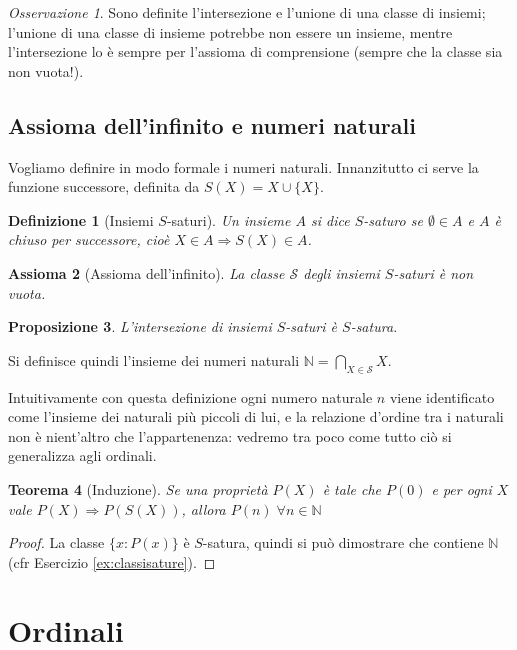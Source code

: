 \documentclass[a4paper,10pt,oneside]{article}
\theoremstyle{plain}
\newtheorem{mytheorem}{Teorema}[section]
\newtheorem{mydef}[mytheorem]{Definizione}
\newtheorem{myprop}[mytheorem]{Proposizione}
\newtheorem{myax}[mytheorem]{Assioma}
\theoremstyle{definition}
\theoremstyle{remark}
\newtheorem*{myobs}{Osservazione}
\begin{document}
\begin{myobs}
 Sono definite l'intersezione e l'unione di una classe di insiemi; l'unione di una classe di insieme potrebbe non essere un insieme, mentre l'intersezione lo è sempre per l'assioma di comprensione (sempre che la classe sia non vuota!).
\end{myobs}


\subsection{Assioma dell'infinito e numeri naturali}

Vogliamo definire in modo formale i numeri naturali. Innanzitutto ci serve la funzione successore, definita da $S(X)=X\cup\{X\}$. 
\begin{mydef}[Insiemi $S$-saturi]
Un insieme $A$ si dice $S$-saturo se $\emptyset \in A$ e $A$ è chiuso per successore, cioè $X\in A \Rightarrow S(X)\in A$.
\end{mydef}
\begin{myax}[Assioma dell'infinito]
 La classe $\mathcal S$ degli insiemi $S$-saturi è non vuota.
\end{myax}

\begin{myprop}
 L'intersezione di insiemi $S$-saturi è $S$-satura.
\end{myprop}

Si definisce quindi l'insieme dei numeri naturali $\mathbb N = \bigcap_{X\in \mathcal S} X$. 

Intuitivamente con questa definizione ogni numero naturale $n$ viene identificato come l'insieme dei naturali più piccoli di lui, e la relazione d'ordine tra i naturali non è nient'altro che l'appartenenza: vedremo tra poco come tutto ciò si generalizza agli ordinali.

\begin{mytheorem}[Induzione]
 Se una proprietà $P(X)$ è tale che $P(0)$ e per ogni $X$ vale $P(X)\Rightarrow P(S(X))$, allora $P(n)\;\forall n\in \mathbb N$
\end{mytheorem}
\begin{proof}
 La classe $\{x: P(x)\}$ è $S$-satura, quindi si può dimostrare che contiene $\mathbb N$ (cfr Esercizio \ref{ex:classisature}).
\end{proof}


\section{Ordinali}
\end{document}
